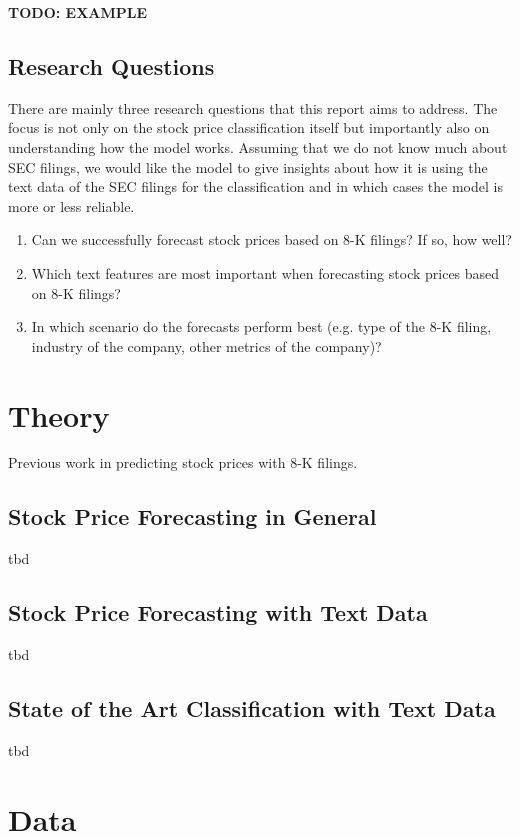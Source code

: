 \documentclass{article}
\begin{document}
	\textbf{TODO: EXAMPLE}
	
	\subsection{Research Questions}
	
	There are mainly three research questions that this report aims to address. The focus is not only on the stock price classification itself but importantly also on understanding how the model works. Assuming that we do not know much about SEC filings, we would like the model to give insights about how it is using the text data of the SEC filings for the classification and in which cases the model is more or less reliable. 
	
	\begin{enumerate}
		\item Can we successfully forecast stock prices based on 8-K filings? If so, how well?
		\item Which text features are most important when forecasting stock prices based on 8-K filings?
		\item In which scenario do the forecasts perform best (e.g. type of the 8-K filing, industry of the company, other metrics of the company)?
	\end{enumerate}
	

	\section{Theory}
	
	Previous work in predicting stock prices with 8-K filings.
	
	\subsection{Stock Price Forecasting in General}
	tbd 
	
	\subsection{Stock Price Forecasting with Text Data}
	tbd
	
	\subsection{State of the Art Classification with Text Data}
	tbd

	\section{Data}
	
\end{document}
